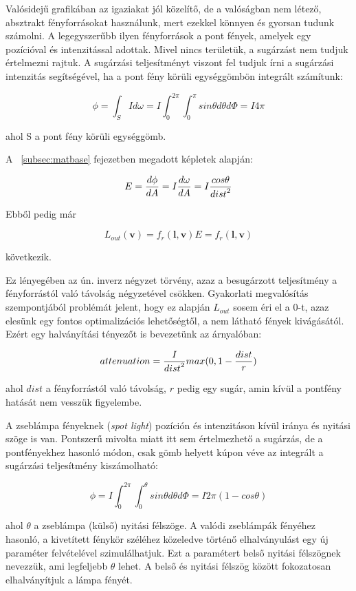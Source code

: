 Valósidejű grafikában az igaziakat jól közelítő, de a valóságban nem létező, absztrakt fényforrásokat használunk, mert ezekkel könnyen és gyorsan tudunk számolni. A legegyszerűbb ilyen fényforrások a pont fények, amelyek egy pozícióval és intenzitással adottak. Mivel nincs területük, a sugárzást nem tudjuk értelmezni rajtuk. A sugárzási teljesítményt viszont fel tudjuk írni a sugárzási intenzitás segítségével, ha a pont fény körüli egységgömbön integrált számítunk:

\[
\phi = \int_S { I d\omega } = I \int_0^{2\pi} { \int_0^\pi { sin\theta d\theta d\Phi } } = I 4\pi
\]

ahol S a pont fény körüli egységgömb.

A ~\ref{subsec:matbase} fejezetben megadott képletek alapján:

\[
E = { { d\phi } \over { dA } } = I { { d\omega } \over { dA } } = I { { cos\theta } \over { dist }^2 }
\]

Ebből pedig már

\[
L_{out}(\mathbf{v}) = f_r(\mathbf{l}, \mathbf{v}) E = f_r(\mathbf{l}, \mathbf{v}) {}
\]

következik.

Ez lényegében az ún. inverz négyzet törvény, azaz a besugárzott teljesítmény a fényforrástól való távolság négyzetével csökken. Gyakorlati megvalósítás szempontjából problémát jelent, hogy ez alapján \(L_{out}\) sosem éri el a 0-t, azaz elesünk egy fontos optimalizációs lehetőségtől, a nem látható fények kivágásától. Ezért egy halványítási tényezőt is bevezetünk az árnyalóban:

\[
attenuation = { I \over {dist}^2 } max(0, 1 - { dist \over r })
\]

ahol \(dist\) a fényforrástól való távolság, \(r\) pedig egy sugár, amin kívül a pontfény hatását nem vesszük figyelembe.

A zseblámpa fényeknek (\textit{spot light}) pozíción és intenzitáson kívül iránya és nyitási szöge is van. Pontszerű mivolta miatt itt sem értelmezhető a sugárzás, de a pontfényekhez hasonló módon, csak gömb helyett kúpon véve az integrált a sugárzási teljesítmény kiszámolható:

\[
\phi = I \int_0^{2\pi} { \int_0^\theta { sin\theta d\theta d\Phi } } = I 2\pi (1 - cos\theta)
\]

ahol \(\theta\) a zseblámpa (külső) nyitási félszöge. A valódi zseblámpák fényéhez hasonló, a kivetített fénykör széléhez közeledve történő elhalványulást egy új paraméter felvételével szimulálhatjuk. Ezt a paramétert belső nyitási félszögnek nevezzük, ami legfeljebb \(\theta\) lehet. A belső és nyitási félszög között fokozatosan elhalványítjuk a lámpa fényét.

